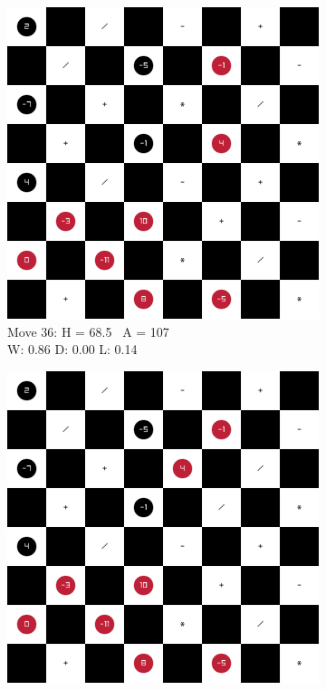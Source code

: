 \begin{figure}[H]
    \centering
    \begin{subfigure}{0.3\textwidth}
        \centering
        \includegraphics[width=\textwidth]{images/games/game3b/move_37.png}
        \caption*{Move 36: H = 68.5 \textbar\ A = 107 \\ W: 0.86 D: 0.00 L: 0.14}
    \end{subfigure}
    \quad
    \begin{subfigure}{0.3\textwidth}
        \centering
        \includegraphics[width=\textwidth]{images/games/game3b/move_38.png}

\end{subfigure}
\end{figure}
